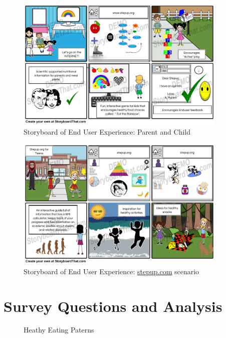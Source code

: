 \documentclass[letterpaper,12pt]{article}
\begin{document}
\begin{figure}[ht!]
  \centering
  \includegraphics[width=0.9\textwidth]{assets/jpg/parent_and_children_experience}
  \caption{Storyboard of End User Experience: Parent and Child}
  \label{fig:parent-and-children-experience}
\end{figure}
\FloatBarrier
\begin{figure}[ht!]
  \centering
  \includegraphics[width=0.9\textwidth]{assets/jpg/stepup_com_scenario_2}
  \caption{Storyboard of End User Experience: \url{stepup.com} scenario}
  \label{fig:stepup-com-scenario-2}
\end{figure}
\FloatBarrier

\section{Survey Questions and Analysis}

\begin{figure}[ht!]
  \centering
  \begin{bchart}[step=15,max=45,width=12cm]
  \end{bchart}
  \caption{Heathy Eating Paterns}
  \label{tab:heating-patterns}
\end{figure}
\end{document}
